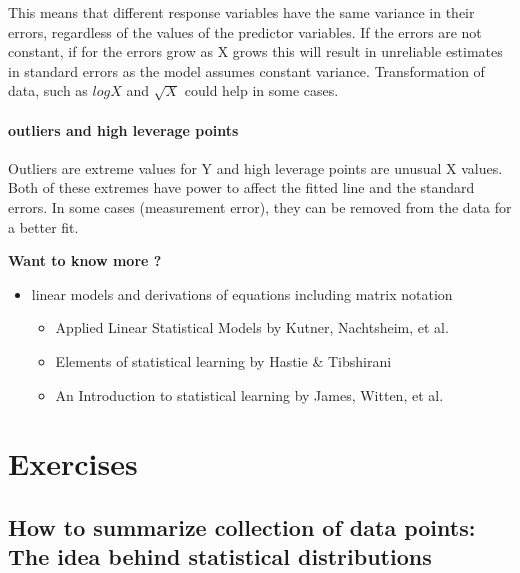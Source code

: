 \documentclass[12pt,]{krantz}
\providecommand{\tightlist}{%
  \setlength{\itemsep}{0pt}\setlength{\parskip}{0pt}}
\let\oldparagraph\paragraph
\renewcommand{\paragraph}[1]{\oldparagraph{#1}\mbox{}}
\let\BeginKnitrBlock\begin \let\EndKnitrBlock\end
\begin{document}
This means that different response variables have the same variance in their errors, regardless of the values of the predictor variables. If
the errors are not constant, if for the errors grow as X grows this
will result in unreliable estimates in standard errors as the model
assumes constant variance. Transformation of data, such as
\(logX\) and \(\sqrt{X}\) could help in some cases.

\hypertarget{outliers-and-high-leverage-points}{%
\paragraph{outliers and high leverage points}\label{outliers-and-high-leverage-points}}

Outliers are extreme values for Y and high leverage points are unusual
X values. Both of these extremes have power to affect the fitted line
and the standard errors. In some cases (measurement error), they can be
removed from the data for a better fit.

\BeginKnitrBlock{rmdtip}
\textbf{Want to know more ?}

\begin{itemize}
\tightlist
\item
  linear models and derivations of equations including matrix notation

  \begin{itemize}
  \tightlist
  \item
    Applied Linear Statistical Models by Kutner, Nachtsheim, et al.
  \item
    Elements of statistical learning by Hastie \& Tibshirani
  \item
    An Introduction to statistical learning by James, Witten, et al.
  \end{itemize}
\end{itemize}
\EndKnitrBlock{rmdtip}

\hypertarget{exercises-1}{%
\section{Exercises}\label{exercises-1}}

\hypertarget{how-to-summarize-collection-of-data-points-the-idea-behind-statistical-distributions-1}{%
\subsection{How to summarize collection of data points: The idea behind statistical distributions}\label{how-to-summarize-collection-of-data-points-the-idea-behind-statistical-distributions-1}}
\end{document}
